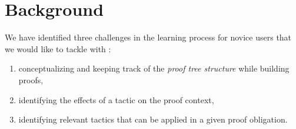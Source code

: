 \section{Background}


We have identified three challenges in the learning process for novice users
that we would like to tackle with \PeaCoq{}:

\begin{enumerate}

  \item conceptualizing and keeping track of the \emph{proof tree structure}
while building proofs,

  \item identifying the effects of a tactic on the proof context,

  \item identifying relevant tactics that can be applied in a given proof
obligation.

\end{enumerate}
